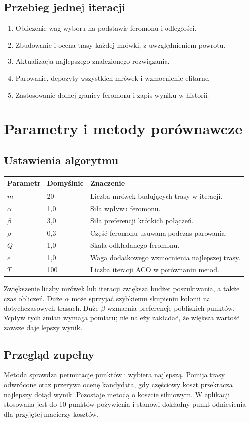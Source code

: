 \documentclass[11pt,a4paper]{article}
\newcommand{\rozdzial}[1]{\clearpage\section{#1}}
\begin{document}
\subsection{Przebieg jednej iteracji}
\begin{enumerate}
\item Obliczenie wag wyboru na podstawie feromonu i odległości.
\item Zbudowanie i ocena trasy każdej mrówki, z uwzględnieniem powrotu.
\item Aktualizacja najlepszego znalezionego rozwiązania.
\item Parowanie, depozyty wszystkich mrówek i wzmocnienie elitarne.
\item Zastosowanie dolnej granicy feromonu i zapis wyniku w historii.
\end{enumerate}

\rozdzial{Parametry i metody porównawcze}
\subsection{Ustawienia algorytmu}
\begin{tabularx}{\textwidth}{@{}p{2cm}p{2cm}Y@{}}
\toprule
\textbf{Parametr} & \textbf{Domyślnie} & \textbf{Znaczenie} \\
\midrule
$m$ & 20 & Liczba mrówek budujących trasy w iteracji. \\
$\alpha$ & 1,0 & Siła wpływu feromonu. \\
$\beta$ & 3,0 & Siła preferencji krótkich połączeń. \\
$\rho$ & 0,3 & Część feromonu usuwana podczas parowania. \\
$Q$ & 1,0 & Skala odkładanego feromonu. \\
$e$ & 1,0 & Waga dodatkowego wzmocnienia najlepszej trasy. \\
$T$ & 100 & Liczba iteracji ACO w porównaniu metod. \\
\bottomrule
\end{tabularx}

Zwiększenie liczby mrówek lub iteracji zwiększa budżet poszukiwania, a także czas obliczeń. Duże $\alpha$ może sprzyjać szybkiemu skupieniu kolonii na dotychczasowych trasach. Duże $\beta$ wzmacnia preferencję pobliskich punktów. Wpływ tych zmian wymaga pomiaru; nie należy zakładać, że większa wartość zawsze daje lepszy wynik.

\subsection{Przegląd zupełny}
Metoda sprawdza permutacje punktów i wybiera najlepszą. Pomija trasy odwrócone oraz przerywa ocenę kandydata, gdy częściowy koszt przekracza najlepszy dotąd wynik. Pozostaje metodą o koszcie silniowym. W aplikacji stosowana jest do 10 punktów pożywienia i stanowi dokładny punkt odniesienia dla przyjętej macierzy kosztów.
\end{document}

